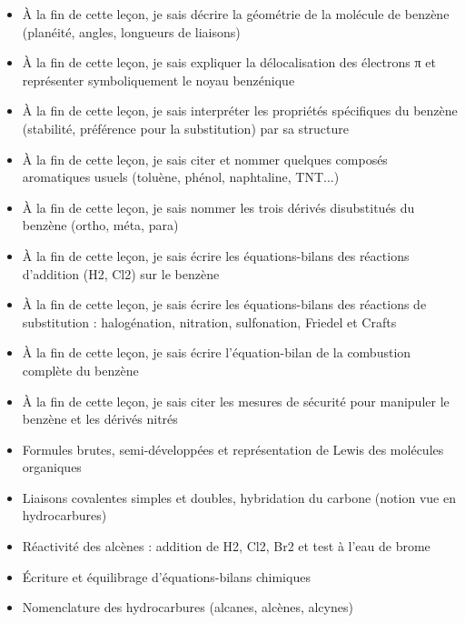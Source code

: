 \documentclass[11pt]{article}
\begin{document}
\begin{objectifs}
\begin{itemize}
\item À la fin de cette leçon, je sais décrire la géométrie de la molécule de benzène (planéité, angles, longueurs de liaisons)
\item À la fin de cette leçon, je sais expliquer la délocalisation des électrons π et représenter symboliquement le noyau benzénique
\item À la fin de cette leçon, je sais interpréter les propriétés spécifiques du benzène (stabilité, préférence pour la substitution) par sa structure
\item À la fin de cette leçon, je sais citer et nommer quelques composés aromatiques usuels (toluène, phénol, naphtaline, TNT...)
\item À la fin de cette leçon, je sais nommer les trois dérivés disubstitués du benzène (ortho, méta, para)
\item À la fin de cette leçon, je sais écrire les équations-bilans des réactions d'addition (H2, Cl2) sur le benzène
\item À la fin de cette leçon, je sais écrire les équations-bilans des réactions de substitution : halogénation, nitration, sulfonation, Friedel et Crafts
\item À la fin de cette leçon, je sais écrire l'équation-bilan de la combustion complète du benzène
\item À la fin de cette leçon, je sais citer les mesures de sécurité pour manipuler le benzène et les dérivés nitrés
\end{itemize}
\end{objectifs}

\begin{prerequis}
\begin{itemize}
\item Formules brutes, semi-développées et représentation de Lewis des molécules organiques
\item Liaisons covalentes simples et doubles, hybridation du carbone (notion vue en hydrocarbures)
\item Réactivité des alcènes : addition de H2, Cl2, Br2 et test à l'eau de brome
\item Écriture et équilibrage d'équations-bilans chimiques
\item Nomenclature des hydrocarbures (alcanes, alcènes, alcynes)
\end{itemize}
\end{prerequis}
\end{document}
